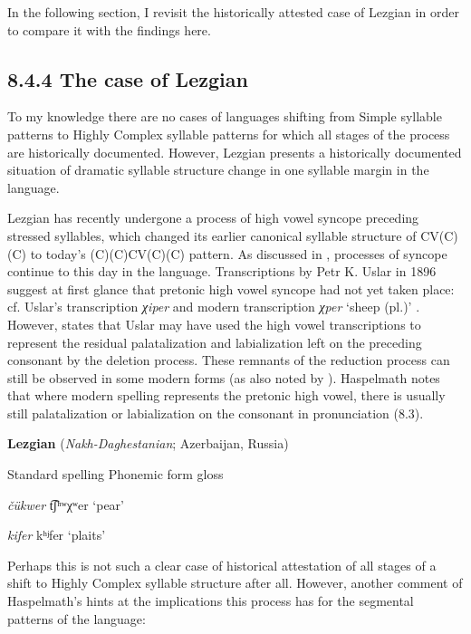   In the following section, I revisit the historically attested case of Lezgian in order to compare it with the findings here.

\subsection{8.4.4 The case of Lezgian}

  To my knowledge there are no cases of languages shifting from Simple syllable patterns to Highly Complex syllable patterns for which all stages of the process are historically documented. However, Lezgian presents a historically documented situation of dramatic syllable structure change in one syllable margin in the language.

  Lezgian has recently undergone a process of high vowel syncope preceding stressed syllables, which changed its earlier canonical syllable structure of CV(C)(C) to today’s (C)(C)CV(C)(C) pattern. As discussed in , processes of syncope continue to this day in the language. Transcriptions by Petr K. Uslar in 1896 suggest at first glance that pretonic high vowel syncope had not yet taken place: cf. Uslar’s transcription \textit{χiper} and modern transcription \textit{χper} ‘sheep (pl.)’ \citep[36]{Haspelmath1993}. However, \citet[56]{Haspelmath1993} states that Uslar may have used the high vowel transcriptions to represent the residual palatalization and labialization left on the preceding consonant by the deletion process. These remnants of the reduction process can still be observed in some modern forms (as also noted by \citealt{ChitoranBabaliyeva2007}). Haspelmath notes that where modern spelling represents the pretonic high vowel, there is usually still palatalization or labialization on the consonant in pronunciation (8.3).

\ea\label{ex:(8.3)}
  \textbf{Lezgian} (\textit{Nakh-Daghestanian}; Azerbaijan, Russia)

Standard spelling  Phonemic form  gloss

\textit{čükwer}      t͡ʃʰʷχʷer    ‘pear’

\textit{kifer}      kʰʲfer       ‘plaits’

\citep[37]{Haspelmath1993}

\z

Perhaps this is not such a clear case of historical attestation of all stages of a shift to Highly Complex syllable structure after all. However, another comment of Haspelmath’s hints at the implications this process has for the segmental patterns of the language:

